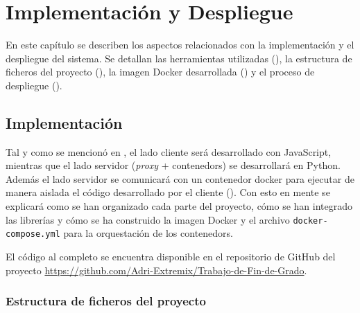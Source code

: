 \chapter{Implementación y Despliegue}\label{chap:implementacion_y_despliegue}

En este capítulo se describen los aspectos relacionados con la implementación y el despliegue del sistema. Se detallan las herramientas utilizadas (), la estructura de ficheros del proyecto (), la \gls{imagen Docker} desarrollada () y el proceso de despliegue ().

\section{Implementación} \label{sec:implementacion}

Tal y como se mencionó en , el lado cliente será desarrollado con JavaScript, mientras que el lado servidor (\textit{\gls{proxy}} + \glspl{contenedor}) se desarrollará en Python. Además el lado servidor se comunicará con un \gls{contenedor} docker para ejecutar de manera aislada el código desarrollado por el cliente (). Con esto en mente se explicará como se han organizado cada parte del proyecto, cómo se han integrado las librerías y cómo se ha construido la \gls{imagen Docker} y el archivo \texttt{docker-compose.yml} para la orquestación de los \glspl{contenedor}.

El código al completo se encuentra disponible en el repositorio de GitHub del proyecto \url{https://github.com/Adri-Extremix/Trabajo-de-Fin-de-Grado}.

\subsection{Estructura de ficheros del proyecto}\label{subsec:estructura_ficheros_proyecto}

